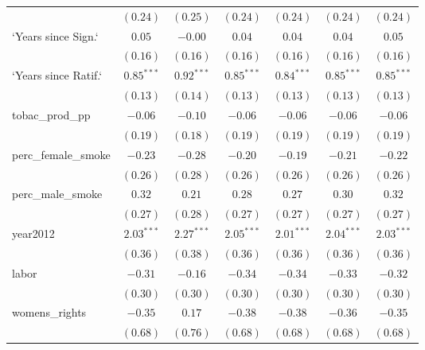 \begin{table}[!h]
\begin{center}
\begin{tabular}{l c c c c c c }
                        & $(0.24)$     & $(0.25)$     & $(0.24)$     & $(0.24)$     & $(0.24)$     & $(0.24)$     \\
`Years since Sign.`     & $0.05$       & $-0.00$      & $0.04$       & $0.04$       & $0.04$       & $0.05$       \\
                        & $(0.16)$     & $(0.16)$     & $(0.16)$     & $(0.16)$     & $(0.16)$     & $(0.16)$     \\
`Years since Ratif.`    & $0.85^{***}$ & $0.92^{***}$ & $0.85^{***}$ & $0.84^{***}$ & $0.85^{***}$ & $0.85^{***}$ \\
                        & $(0.13)$     & $(0.14)$     & $(0.13)$     & $(0.13)$     & $(0.13)$     & $(0.13)$     \\
tobac\_prod\_pp         & $-0.06$      & $-0.10$      & $-0.06$      & $-0.06$      & $-0.06$      & $-0.06$      \\
                        & $(0.19)$     & $(0.18)$     & $(0.19)$     & $(0.19)$     & $(0.19)$     & $(0.19)$     \\
perc\_female\_smoke     & $-0.23$      & $-0.28$      & $-0.20$      & $-0.19$      & $-0.21$      & $-0.22$      \\
                        & $(0.26)$     & $(0.28)$     & $(0.26)$     & $(0.26)$     & $(0.26)$     & $(0.26)$     \\
perc\_male\_smoke       & $0.32$       & $0.21$       & $0.28$       & $0.27$       & $0.30$       & $0.32$       \\
                        & $(0.27)$     & $(0.28)$     & $(0.27)$     & $(0.27)$     & $(0.27)$     & $(0.27)$     \\
year2012                & $2.03^{***}$ & $2.27^{***}$ & $2.05^{***}$ & $2.01^{***}$ & $2.04^{***}$ & $2.03^{***}$ \\
                        & $(0.36)$     & $(0.38)$     & $(0.36)$     & $(0.36)$     & $(0.36)$     & $(0.36)$     \\
labor                   & $-0.31$      & $-0.16$      & $-0.34$      & $-0.34$      & $-0.33$      & $-0.32$      \\
                        & $(0.30)$     & $(0.30)$     & $(0.30)$     & $(0.30)$     & $(0.30)$     & $(0.30)$     \\
womens\_rights          & $-0.35$      & $0.17$       & $-0.38$      & $-0.38$      & $-0.36$      & $-0.35$      \\
                        & $(0.68)$     & $(0.76)$     & $(0.68)$     & $(0.68)$     & $(0.68)$     & $(0.68)$     \\

\end{tabular}
\end{center}
\end{table}
